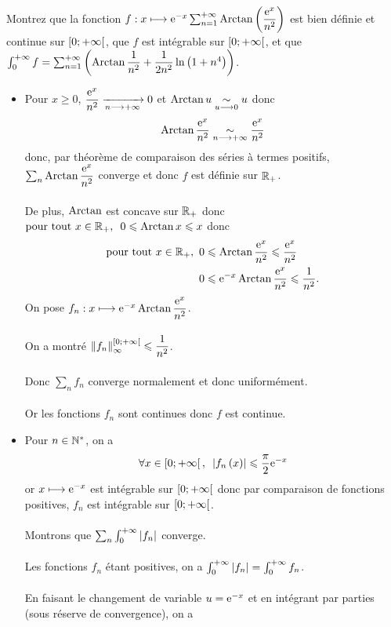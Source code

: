 \begin{exo}
Montrez que la fonction \(f:x\longmapsto\mathrm{e}^{-x}\sum_{n=1}^{+\infty}\operatorname{Arctan}\left(\dfrac{\mathrm{e}^{x}}{n^2}\right)\) est bien définie et continue sur \(\left[0;+\infty\right[\), que \(f\) est intégrable sur \(\left[0;+\infty\right[\), et que \(\int_0^{+\infty}f=\sum_{n=1}^{+\infty}\left(\operatorname{Arctan}\dfrac{1}{n^2}+\dfrac{1}{2n^2}\ln\left(1+n^4\right)\right)\).
\end{exo}

\begin{corr}
\begin{itemize}
    \item Pour \(x\geq0\), \(\dfrac{\mathrm{e}^{x}}{n^2}\xrightarrow[n\longrightarrow+\infty]{}0\) et \(\operatorname{Arctan} u\underset{u\longrightarrow0}{\sim}u\) donc \[\operatorname{Arctan}\dfrac{\mathrm{e}^{x}}{n^2}\underset{n\longrightarrow+\infty}{\sim}\dfrac{\mathrm{e}^{x}}{n^2}\] donc, par théorème de comparaison des séries à termes positifs, \(\sum_n\operatorname{Arctan}\dfrac{\mathrm{e}^{x}}{n^2}\) converge et donc \(f\) est définie sur \(\mathbb{R}_+\). \\\\ De plus, \(\operatorname{Arctan}\) est concave sur \(\mathbb{R}_+\) donc \(\quantifs{\tpt x\in\Rp}0\leq\Arctan x\leq x\) donc \[\begin{aligned}
    \quantifs{\tpt x\in\Rp}&0\leq\Arctan\dfrac{\e{x}}{n^2}\leq\dfrac{\e{x}}{n^2} \\
    &0\leq\e{-x}\Arctan\dfrac{\e{x}}{n^2}\leq\dfrac{1}{n^2}.
    \end{aligned}\] On pose \(f_n:x\longmapsto\mathrm{e}^{-x}\operatorname{Arctan}\dfrac{\mathrm{e}^{x}}{n^2}\). \\\\ On a montré \(\norme{f_n}_\infty^{\intervie{0}{\pinf}}\leq\dfrac{1}{n^2}\). \\\\ Donc \(\sum_nf_n\) converge normalement et donc uniformément. \\\\ Or les fonctions \(f_n\) sont continues donc \(f\) est continue. \\
    \item Pour \(n\in\mathbb{N}^*\), on a \[\quantifs{\forall x\in\intervie{0}{\pinf}}\abs{f_n\paren{x}}\leq\dfrac{\pi}{2}\e{-x}\] or \(x\longmapsto\mathrm{e}^{-x}\) est intégrable sur \(\left[0;+\infty\right[\) donc par comparaison de fonctions positives, \(f_n\) est intégrable sur \(\left[0;+\infty\right[\). \\\\ Montrons que \(\sum_n\int_0^{+\infty}\left\lvert f_n\right\rvert\) converge. \\\\ Les fonctions \(f_n\) étant positives, on a \(\int_0^{+\infty}\left\lvert f_n\right\rvert=\int_0^{+\infty}f_n\). \\\\ En faisant le changement de variable \(u=\mathrm{e}^{-x}\) et en intégrant par parties (sous réserve de convergence), on a \[\begin{aligned}

\end{aligned}\]
\end{itemize}
\end{corr}
